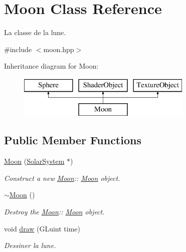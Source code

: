 \hypertarget{classMoon}{}\section{Moon Class Reference}
\label{classMoon}


La classe de la lune.  




{\ttfamily \#include $<$moon.\+hpp$>$}

Inheritance diagram for Moon\+:\begin{figure}[H]
\begin{center}
\leavevmode
\includegraphics[height=2.000000cm]{classMoon}
\end{center}
\end{figure}
\subsection*{Public Member Functions}
\begin{DoxyCompactItemize}
\item 
\mbox{\hyperlink{classMoon_aabd6f46efd4751b9bcf8db3e93c92a44}{Moon}} (\mbox{\hyperlink{classSolarSystem}{Solar\+System}} $\ast$)
\begin{DoxyCompactList}\small\item\em Construct a new \mbox{\hyperlink{classMoon}{Moon}}\+:\+: \mbox{\hyperlink{classMoon}{Moon}} object. \end{DoxyCompactList}\item 
\mbox{\hyperlink{classMoon_a3c2a0d46f278ee7ecf924c4a31da15f1}{$\sim$\+Moon}} ()
\begin{DoxyCompactList}\small\item\em Destroy the \mbox{\hyperlink{classMoon}{Moon}}\+:\+: \mbox{\hyperlink{classMoon}{Moon}} object. \end{DoxyCompactList}\item 
void \mbox{\hyperlink{classMoon_af5b3e353fcb5f042f34dd7495f396b1d}{draw}} (G\+Luint time)
\begin{DoxyCompactList}\small\item\em Dessiner la lune. \end{DoxyCompactList}\end{DoxyCompactItemize}
